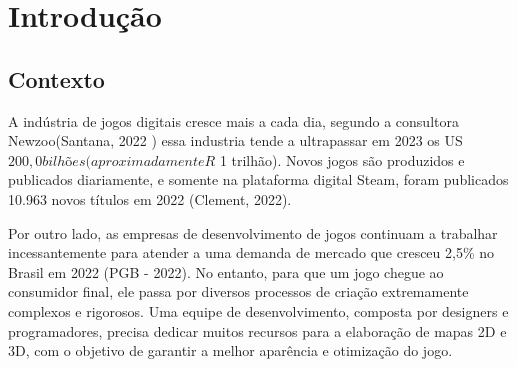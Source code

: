 \documentclass[12pt]{tcc}
\begin{document}

\dcover

\dcoverback
	
		




\dtables
	

\justifying
	
\chapter{Introdução}
\label{sec:introducao}

\section{Contexto}

A indústria de jogos digitais cresce mais a cada dia, segundo a consultora Newzoo(Santana, 2022 ) essa industria tende a ultrapassar em 2023 os US$ 200,0 bilhões (aproximadamente R$ 1 trilhão). Novos jogos são produzidos e publicados diariamente, e somente na plataforma digital Steam, foram publicados 10.963 novos títulos em 2022  (Clement, 2022).

Por outro lado, as empresas de desenvolvimento de jogos continuam a trabalhar incessantemente para atender a uma demanda de mercado que cresceu 2,5\% no Brasil em 2022 (PGB - 2022). No entanto, para que um jogo chegue ao consumidor final, ele passa por diversos processos de criação extremamente complexos e rigorosos. Uma equipe de desenvolvimento, composta por designers e programadores, precisa dedicar muitos recursos para a elaboração de mapas 2D e 3D, com o objetivo de garantir a melhor aparência e otimização do jogo.
\end{document}
